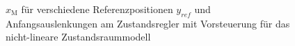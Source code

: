 \begin{figure}[H]
    \centering
    \caption[$x_{\mathrm{M}}$ für Regler mit Vorsteuerung (nicht-linear)]{$x_{\mathrm{M}}$ für verschiedene Referenzpositionen $y_{ref}$ und Anfangsauslenkungen am Zustandsregler mit Vorsteuerung für das nicht-lineare Zustandsraummodell}
    \label{fig:Bild34}
\end{figure}

